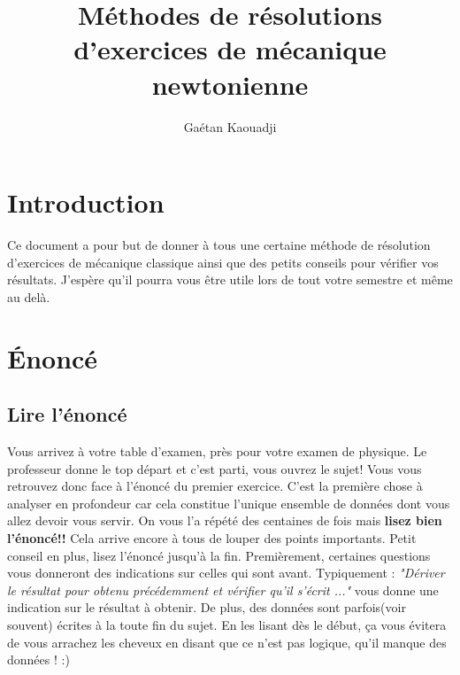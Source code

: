 \documentclass{article}
\title{Méthodes de résolutions d'exercices de mécanique newtonienne}
\author{Gaétan Kaouadji}
\begin{document}
\maketitle
\tableofcontents

\section{Introduction} 
Ce document a pour but de donner à tous une certaine méthode de résolution d'exercices de mécanique classique ainsi que des petits conseils pour vérifier vos résultats. J'espère qu'il pourra vous être utile lors de tout votre semestre et même au delà. 

\section{Énoncé}
\subsection{Lire l'énoncé}
Vous arrivez à votre table d'examen, près pour votre examen de physique. Le professeur donne le top départ et c'est parti, vous ouvrez le sujet! Vous vous retrouvez donc face à l'énoncé du premier exercice. C'est la première chose à analyser en profondeur car cela constitue l'unique ensemble de données dont vous allez devoir vous servir. On vous l'a répété des centaines de fois mais \textbf{lisez bien l'énoncé!!} Cela arrive encore à tous de louper des points importants. Petit conseil en plus, lisez l'énoncé jusqu'à la fin. Premièrement, certaines questions vous donneront des indications sur celles qui sont avant. Typiquement : \textit{"Dériver le résultat pour obtenu précédemment et vérifier qu'il s'écrit ..."} vous donne une indication sur le résultat à obtenir. De plus, des données sont parfois(voir souvent) écrites à la toute fin du sujet. En les lisant dès le début, ça vous évitera de vous arrachez les cheveux en disant que ce n'est pas logique, qu'il manque des données ! :) \\
\end{document}
